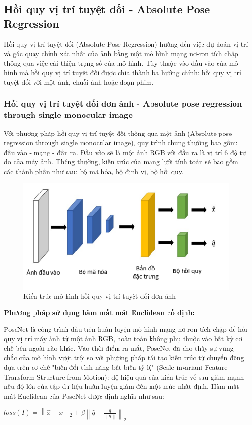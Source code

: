 \subsection{Hồi quy vị trí tuyệt đối - Absolute Pose Regression}

Hồi quy vị trí tuyệt đối (Absolute Pose Regression) hướng đến việc dự đoán vị trí và góc quay chính xác nhất của ảnh bằng một mô hình mạng nơ-ron tích chập thông qua việc cải thiện trọng số của mô hình. Tùy thuộc vào đầu vào của mô hình mà hồi quy vị trí tuyệt đối được chia thành ba hướng chính: hồi quy vị trí tuyệt đối với một ảnh, chuỗi ảnh hoặc đoạn phim.

\subsubsection*{Hồi quy vị trí tuyệt đối đơn ảnh - Absolute pose regression through single monocular image}
Với phương pháp hồi quy vị trí tuyệt đối thông qua một ảnh (Absolute pose regression through single monocular image), quy trình chung thường bao gồm: đầu vào - mạng - đầu ra. Đầu vào sẽ là một ảnh RGB với đầu ra là vị trí 6 độ tự do của máy ảnh. Thông thường, kiến trúc của mạng lưới tính toán sẽ bao gồm các thành phần như sau: bộ mã hóa, bộ định vị, bộ hồi quy. 

\begin{figure}[H]
    \centering
    \includegraphics[scale=0.7]{pics/Chapter2/kientruc_APR_1.png}
    \caption{Kiến trúc mô hình hồi quy vị trí tuyệt đối đơn ảnh \cite{kendall2016posenet}}
\end{figure}

\noindent\textbf{Phương pháp sử dụng hàm mất mát Euclidean cố định:}

PoseNet \cite{kendall2016posenet} là công trình đầu tiên huấn luyện mô hình mạng nơ-ron tích chập để hồi quy vị trí máy ảnh từ một ảnh RGB, hoàn toàn không phụ thuộc vào bất kỳ cơ chế bên ngoài nào khác. Vào thời điểm ra mắt, PoseNet đã cho thấy sự vững chắc của mô hình vượt trội so với phương pháp tái tạo kiến trúc từ chuyển động dựa trên cơ chế "biến đổi tính năng bất biến tỷ lệ" (Scale-invariant Feature Transform Structure from Motion): độ hiệu quả của kiến trúc vế sau giảm mạnh nếu độ lớn của tập dữ liệu huấn luyện giảm đến một mức nhất định. Hàm mất mát Euclidean của PoseNet được định nghĩa như sau:
\begin{center}
$loss(I) = \left \| \hat{x} - x \right \|_2 + \beta \left \| \hat{q} - \frac{q}{\left \| q \right \|} \right \|_2$
\end{center}

